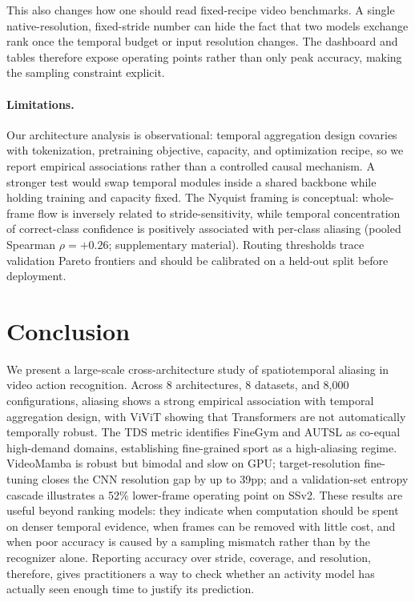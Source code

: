 \documentclass[runningheads]{llncs}
\newcommand{\TDS}{\textsc{TDS}}
\begin{document}
This also changes how one should read fixed-recipe video benchmarks. A single native-resolution, fixed-stride number can hide the fact that two models exchange rank once the temporal budget or input resolution changes. The dashboard and tables therefore expose operating points rather than only peak accuracy, making the sampling constraint explicit.

\paragraph{Limitations.}
Our architecture analysis is observational: temporal aggregation design covaries with tokenization, pretraining objective, capacity, and optimization recipe, so we report empirical associations rather than a controlled causal mechanism. A stronger test would swap temporal modules inside a shared backbone while holding training and capacity fixed. The Nyquist framing is conceptual: whole-frame flow is inversely related to stride-sensitivity, while temporal concentration of correct-class confidence is positively associated with per-class aliasing (pooled Spearman $\rho=+0.26$; supplementary material). Routing thresholds trace validation Pareto frontiers and should be calibrated on a held-out split before deployment.

\section{Conclusion}
\label{sec:conclusion}

We present a large-scale cross-architecture study of spatiotemporal aliasing in video action recognition. Across 8 architectures, 8 datasets, and 8,000 configurations, aliasing shows a strong empirical association with temporal aggregation design, with ViViT showing that Transformers are not automatically temporally robust. The \TDS{} metric identifies FineGym and AUTSL as co-equal high-demand domains, establishing fine-grained sport as a high-aliasing regime. VideoMamba is robust but bimodal and slow on GPU; target-resolution fine-tuning closes the CNN resolution gap by up to 39pp; and a validation-set entropy cascade illustrates a 52\% lower-frame operating point on SSv2. These results are useful beyond ranking models: they indicate when computation should be spent on denser temporal evidence, when frames can be removed with little cost, and when poor accuracy is caused by a sampling mismatch rather than by the recognizer alone. Reporting accuracy over stride, coverage, and resolution, therefore, gives practitioners a way to check whether an activity model has actually seen enough time to justify its prediction.



\end{document}
